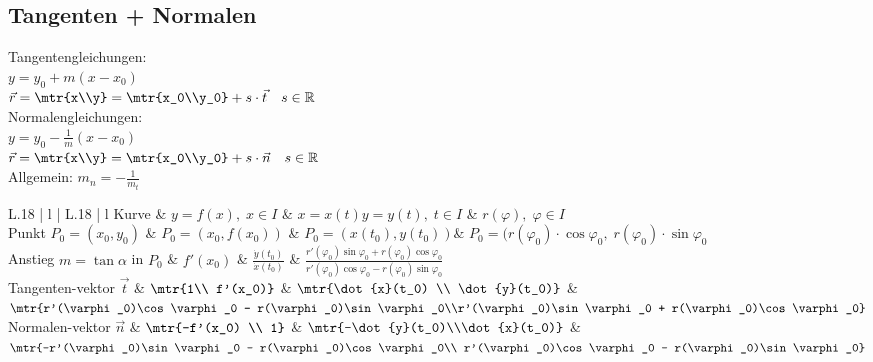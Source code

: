 \subsection{Tangenten + Normalen}
Tangentengleichungen:\\
$y=y_0+m(x-x_0)$\\
$\vec{r}=\mtr{x\\y}=\mtr{x_0\\y_0}+s \cdot \vec{t} \quad s\in \mathbb{R}$\\
Normalengleichungen:\\
$y=y_0-\frac{1}{m}(x-x_0)$\\
$\vec{r}=\mtr{x\\y}=\mtr{x_0\\y_0}+s\cdot \vec{n} \quad s \in \mathbb{R}$\\
Allgemein: $m_n=-\frac{1}{m_t}$\\
\begin{tabular}{L{.18} | l | L{.18} | l}
Kurve & $y=f(x),\;x\in I$ & $x=x(t)$\newline $y=y(t), \; t\in I$ & $r(\varphi), \; \varphi \in I$ \\
\hline 
Punkt \newline$P_0=(x_0,y_0)$ & $P_0=(x_0,f(x_0))$ & $P_0=(x(t_0),y(t_0))$& $P_0=(r(\varphi_0)\cdot \cos\varphi_0 , \; r(\varphi_0) \cdot \sin \varphi_0$\\
Anstieg $m=\tan\alpha$ in $P_0$ & $f'(x_0)$ & $\frac{\dot{y}(t_0)}{\dot{x}(t_0)}$ & $\frac{r'(\varphi_0)\sin\varphi_0 + r(\varphi_0)\cos \varphi_0}{r'(\varphi_0)\cos\varphi_0 - r(\varphi_0)\sin \varphi_0}$\\
Tangenten-\newline vektor $\vec{t}$ & $\mtr{1\\ f'(x_0)}$ & $\mtr{\dot{x}(t_0) \\ \dot{y}(t_0)}$ & $\mtr{r'(\varphi_0)\cos\varphi_0 - r(\varphi_0)\sin \varphi_0\\r'(\varphi_0)\sin\varphi_0 + r(\varphi_0)\cos \varphi_0}$\\
Normalen-\newline vektor $\vec{n}$ & $\mtr{-f'(x_0) \\ 1}$ & $\mtr{-\dot{y}(t_0)\\\dot{x}(t_0)}$ & $\mtr{-r'(\varphi_0)\sin\varphi_0 - r(\varphi_0)\cos \varphi_0\\ r'(\varphi_0)\cos\varphi_0 - r(\varphi_0)\sin \varphi_0}$ \\
\end{tabular}\\

